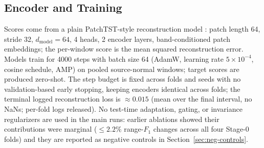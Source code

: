 \subsection{Encoder and Training}
\label{sec:encoder}
Scores come from a plain PatchTST-style reconstruction model \cite{patchtst2023}: patch length 64, stride 32, $d_{\mathrm{model}}=64$, 4 heads, 2 encoder layers, band-conditioned patch embeddings; the per-window score is the mean squared reconstruction error. Models train for 4000 steps with batch size 64 (AdamW, learning rate $5\times10^{-4}$, cosine schedule, AMP) on pooled source-normal windows; target scores are produced zero-shot. The step budget is fixed across folds and seeds with no validation-based early stopping, keeping encoders identical across folds; the terminal logged reconstruction loss is $\approx 0.015$ (mean over the final interval, no NaNs; per-fold logs released). No test-time adaptation, gating, or invariance regularizers are used in the main runs: earlier ablations showed their contributions were marginal ($\leq 2.2\%$ range-$F_1$ changes across all four Stage-0 folds) and they are reported as negative controls in Section~\ref{sec:neg-controls}.
